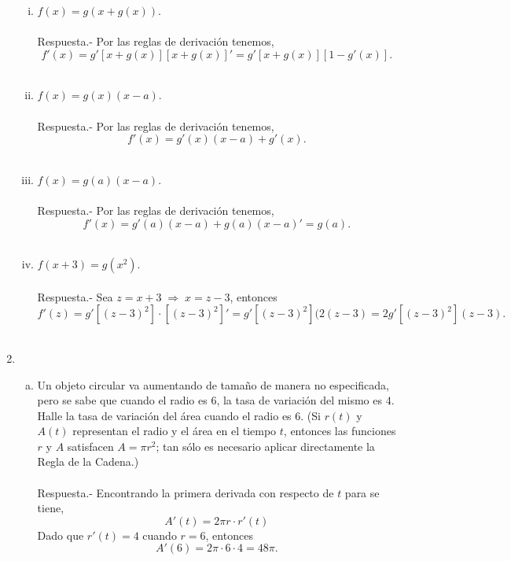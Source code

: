 \begin{enumerate}[\bfseries 1.]
\begin{enumerate}[(i)]
	    \item $f(x)=g(x+g(x))$.\\\\
		Respuesta.-\; Por las reglas de derivación tenemos,
		$$f'(x)=g'\left[x+g(x)\right]\left[x+g(x)\right]'=g'\left[x+g(x)\right]\left[1-g'(x)\right].$$\\

	    \item $f(x)=g(x)(x-a)$.\\\\
		Respuesta.-\; Por las reglas de derivación tenemos,
		$$f'(x)=g'(x)(x-a)+g'(x).$$\\

	    \item $f(x)=g(a)(x-a)$.\\\\
		Respuesta.-\; Por las reglas de derivación tenemos,
		$$f'(x)=g'(a)(x-a)+g(a)(x-a)' = g(a).$$\\

	    \item $f(x+3)=g\left(x^2\right)$.\\\\
		Respuesta.-\; Sea $z=x+3\; \Rightarrow \; x=z-3$, entonces
		$$f'(z)=g'\left[(z-3)^2\right]\cdot \left[(z-3)^2\right]'=g'\left[(z-3)^2\right](2(z-3)=2g'\left[(z-3)^2\right](z-3).$$\\

	\end{enumerate}

    \item 
	\begin{enumerate}[(a)]

	    \item Un objeto circular va aumentando de tamaño de manera no especificada, pero se sabe que cuando el radio es $6$, la tasa de variación del mismo es $4$. Halle la tasa de variación del área cuando el radio es $6$. (Si $r(t)$ y $A(t)$ representan el radio y el área en el tiempo $t$, entonces las funciones $r$ y $A$ satisfacen $A = \pi r^2$; tan sólo es necesario aplicar directamente la Regla de la Cadena.)\\\\
		Respuesta.-\; Encontrando la primera derivada con respecto de $t$ para se tiene,
		$$A'(t)=2\pi r\cdot r'(t)$$
		Dado que $r'(t)=4$ cuando $r=6$, entonces
		$$A'(6)=2\pi\cdot 6 \cdot 4 = 48\pi.$$\\


\end{enumerate}
\end{enumerate}
